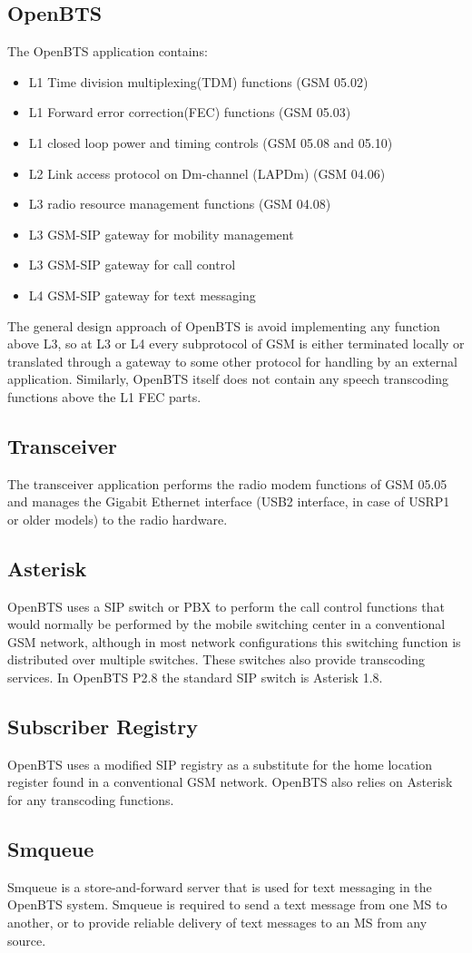  \subsection{OpenBTS}
The OpenBTS application contains:
\begin{itemize}
\item L1 Time division multiplexing(TDM) functions (GSM 05.02)
\item L1 Forward error correction(FEC) functions (GSM 05.03)
\item L1 closed loop power and timing controls (GSM 05.08 and 05.10)
\item L2 Link access protocol on Dm-channel (LAPDm) (GSM 04.06)
\item L3 radio resource management functions (GSM 04.08)
\item L3 GSM-SIP gateway for mobility management
\item L3 GSM-SIP gateway for call control
\item L4 GSM-SIP gateway for text messaging
\end{itemize}

The general design approach of OpenBTS is avoid implementing any function above L3, so at L3 or L4 every subprotocol of GSM is either terminated locally or translated through a gateway to some other protocol for handling by an external application. Similarly, OpenBTS itself does not contain any speech transcoding functions above the L1 FEC parts.

\subsection{Transceiver}
The transceiver application performs the radio modem functions of GSM 05.05 and manages the Gigabit Ethernet interface
(USB2 interface, in case
of USRP1 or older models) to the radio hardware.

\subsection{Asterisk}
OpenBTS uses a SIP switch or PBX to perform the call control functions that would normally be performed by the mobile switching center in a conventional GSM network, although in most network configurations this switching function is distributed over multiple switches. These switches also provide transcoding services. In OpenBTS P2.8 the standard SIP switch is Asterisk 1.8.

\subsection{Subscriber Registry}
OpenBTS uses a modified SIP registry as a substitute for the home location register found in a conventional GSM network. OpenBTS also relies on Asterisk for any transcoding functions.

\subsection{Smqueue}
Smqueue is a store-and-forward server that is used for text messaging in the OpenBTS system. Smqueue is required to send a text message from one MS to another, or to provide reliable delivery of text messages to an MS from any source.

